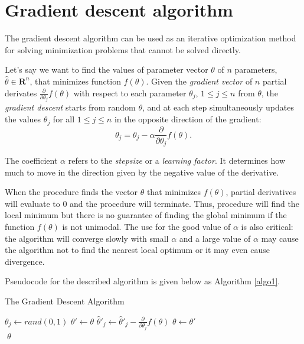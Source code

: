 \documentclass[times, utf8, zavrsni]{fer}
\begin{document}
\section{Gradient descent algorithm}

The gradient descent algorithm can be used as an iterative optimization method for solving minimization problems that cannot be solved directly.

Let's say we want to find the values of parameter vector $\theta$ of $n$  parameters, $\hat \theta \in \mathbf{R}^n$, that minimizes function $f(\theta)$. Given the \emph{gradient vector} of $n$ partial derivates $\frac{\partial}{\partial \theta_j} f(\theta)$  with respect to each parameter $\theta_j$, $1 \le j \le n$ from $\theta$, the \emph{gradient descent} starts  from random $\theta$, and at each step simultaneously updates the values $\theta_j$ for all $1 \le j \le n$ in the opposite direction of the gradient:
\begin{equation}
\theta_j = \theta_j - \alpha \frac{\partial}{\partial \theta_j} f(\theta).
\end{equation}

The coefficient $\alpha$ refers to the \emph{stepsize} or a \emph{learning factor}. It  determines how much to move in the direction given by the negative value of the derivative.

When the procedure finds the vector $\theta$ that minimizes $f(\theta)$, partial derivatives will evaluate to $0$ and the procedure will terminate. Thus, procedure will find the local minimum but there is no guarantee of finding the global minimum if the function $f(\theta)$ is not unimodal. The use for the good value of $\alpha$ is also critical: the algorithm will converge slowly with small $\alpha$ and  a large value of $\alpha$ may cause the algorithm not to find the nearest local optimum or it may even cause divergence. 

Pseudocode for the described algorithm is given below as Algorithm \ref{algo1}.  
\begin{algorithm} 
\caption{The Gradient Descent Algorithm}
\label{algo1}
\begin{algorithmic}
    \State $\theta_j \gets rand(0, 1)$
\EndFor
\Repeat
\State $\theta' \gets \theta$
\State $\hat \theta'_j \gets \hat \theta'_j - \frac{\partial}{\partial \theta_j}f(\theta)$  
\EndFor
\State $\theta  \gets \theta'$    
 \\
\Return $\; \theta$
\end{algorithmic}
\end{algorithm}
\end{document}
